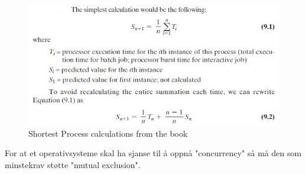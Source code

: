 \begin{figure}[h!]
\centering
\includegraphics{img/SPN.JPG}
\caption{Shortest Process calculations from the book}
\label{fig:spn}
\end{figure}


For at et operativsysteme skal ha sjanse til å oppnå "concurrency" så må den som minstekrav støtte "mutual exclusion".